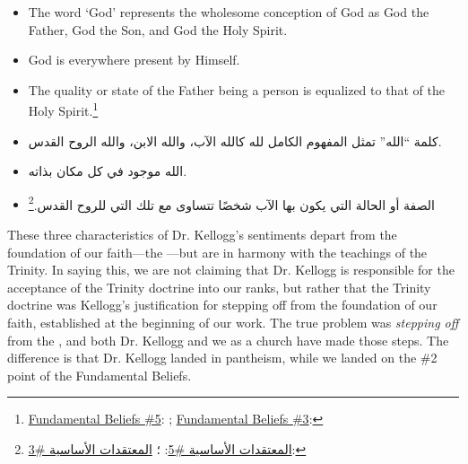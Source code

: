 \begin{itemize}
    \item The word ‘God’ represents the wholesome conception of God as God the Father, God the Son, and God the Holy Spirit.
    \item God is everywhere present by Himself.
    \item The quality or state of the Father being a person is equalized to that of the Holy Spirit.\footnote{\href{https://www.adventist.org/wp-content/uploads/2020/06/ADV-28Beliefs2020.pdf}{Fundamental Beliefs \#5}: ; \href{https://www.adventist.org/wp-content/uploads/2020/06/ADV-28Beliefs2020.pdf}{Fundamental Beliefs \#3}: }
\end{itemize}


\begin{itemize}
    \item كلمة “الله” تمثل المفهوم الكامل لله كالله الآب، والله الابن، والله الروح القدس.
    \item الله موجود في كل مكان بذاته.
    \item الصفة أو الحالة التي يكون بها الآب شخصًا تتساوى مع تلك التي للروح القدس.\footnote{\href{https://www.adventist.org/wp-content/uploads/2020/06/ADV-28Beliefs2020.pdf}{المعتقدات الأساسية \#5}: ؛ \href{https://www.adventist.org/wp-content/uploads/2020/06/ADV-28Beliefs2020.pdf}{المعتقدات الأساسية \#3}: }
\end{itemize}


These three characteristics of Dr. Kellogg's sentiments depart from the foundation of our faith—the —but are in harmony with the teachings of the Trinity. In saying this, we are not claiming that Dr. Kellogg is responsible for the acceptance of the Trinity doctrine into our ranks, but rather that the Trinity doctrine was Kellogg's justification for stepping off from the foundation of our faith, established at the beginning of our work. The true problem was \textit{stepping off} from the , and both Dr. Kellogg and we as a church have made those steps. The difference is that Dr. Kellogg landed in pantheism, while we landed on the \#2 point of the Fundamental Beliefs.


